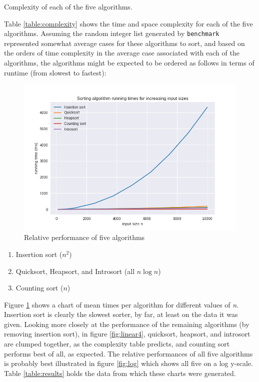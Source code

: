 \documentclass[12pt, a4paper]{article}
\begin{document}
\begin{table}[H]
    \resizebox{\textwidth}{!}{%
    
    }
\caption{Complexity of each of the five algorithms.}
\label{table:complexity}
\end{table}


Table \ref{table:complexity} shows the time and space complexity for each of the five algorithms. Assuming the random integer list generated by \texttt{benchmark} represented somewhat average cases for these algorithms to sort, and based on the orders of time complexity in the average case associated with each of the algorithms, the algorithms might be expected to be ordered as follows in terms of runtime (from slowest to fastest):

\begin{figure}
    \includegraphics[width=\linewidth]{../bm_output/plot_0_linear_20210513-101604.png}
    \caption{Relative performance of five algorithms}
    \label{fig:linear5}
\end{figure}

\begin{enumerate}
    \itemsep0em 
    \item Insertion sort ($n^{2}$)
    \item Quicksort, Heapsort, and Introsort (all $n\log n$)
    \item Counting sort ($n$)
\end{enumerate}

Figure \ref{fig:linear5} shows a chart of mean times per algorithm for different values of \emph{n}. Insertion sort is clearly the slowest sorter, by far, at least on the data it was given. Looking more closely at the performance of the remaining algorithms (by removing insertion sort), in figure \ref{fig:linear4}, quicksort, heapsort, and introsort are clumped together, as the complexity table predicts, and counting sort performs best of all, as expected. The relative performances of all five algorithms is probably best illustrated in figure \ref{fig:log} which shows all five on a log y-scale. Table \ref{table:results} holds the data from which these charts were generated.
\end{document}
